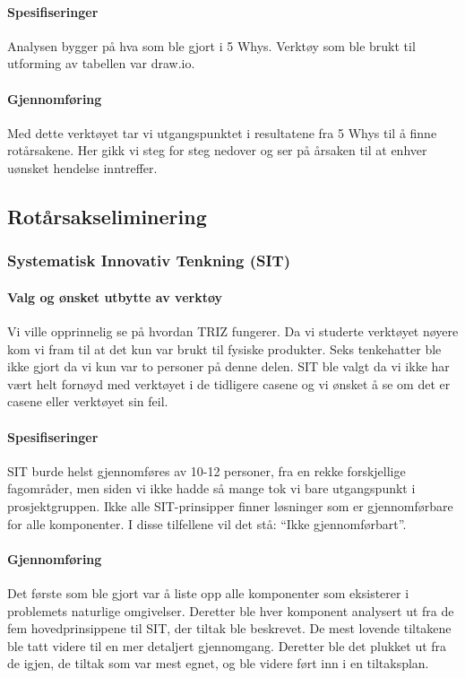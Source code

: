 \paragraph{Spesifiseringer}
Analysen bygger på hva som ble gjort i 5 Whys. Verktøy som ble brukt til utforming av tabellen var draw.io.

\paragraph{Gjennomføring}
Med dette verktøyet tar vi utgangspunktet i resultatene fra 5 Whys til å finne rotårsakene. Her gikk vi steg for steg nedover og ser på årsaken til at enhver uønsket hendelse inntreffer.


\subsection{Rotårsakseliminering}
\subsubsection{Systematisk Innovativ Tenkning (SIT)}

\paragraph{Valg og ønsket utbytte av verktøy}
Vi ville opprinnelig se på hvordan TRIZ fungerer. Da vi studerte verktøyet nøyere kom vi fram til at det kun var brukt til fysiske produkter. Seks tenkehatter ble ikke gjort da vi kun var to personer på denne delen. SIT ble valgt da vi ikke har vært helt fornøyd med verktøyet i de tidligere casene og vi ønsket å se om det er casene eller verktøyet sin feil.
  

\paragraph{Spesifiseringer}
SIT burde helst gjennomføres av 10-12 personer, fra en rekke forskjellige fagområder, men siden vi ikke hadde så mange tok vi bare utgangspunkt i prosjektgruppen. Ikke alle SIT-prinsipper finner løsninger som er gjennomførbare for alle komponenter. I disse tilfellene vil det stå: ``Ikke gjennomførbart''. 

\paragraph{Gjennomføring}
Det første som ble gjort var å liste opp alle komponenter som eksisterer i problemets naturlige omgivelser. Deretter ble hver komponent analysert ut fra de fem hovedprinsippene til SIT, der tiltak ble beskrevet. De mest lovende tiltakene ble tatt videre til en mer detaljert gjennomgang. Deretter ble det plukket ut fra de igjen, de tiltak som var mest egnet, og ble videre ført inn i en tiltaksplan. 

